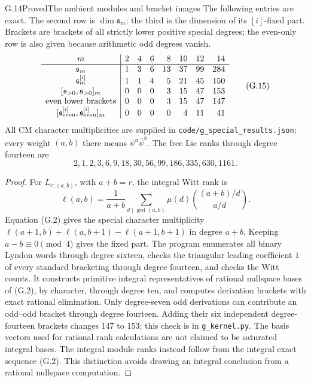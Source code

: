 \begin{statement}{G.14}{Proved}{The ambient modules and bracket images}
The following entries are exact. The second row is
$\dim\mathfrak s_m$; the third is the dimension of its $[i]$-fixed
part. Brackets are brackets of all strictly lower positive special
degrees; the even-only row is also given because arithmetic odd
degrees vanish.
\[
\begin{array}{c|rrrrrrr}
m&2&4&6&8&10&12&14\\\hline
\mathfrak s_m&1&3&6&13&37&99&284\\
\mathfrak s_m^{[i]}&1&1&4&5&21&45&150\\
{}[\mathfrak s_{>0},\mathfrak s_{>0}]_m&0&0&0&3&15&47&153\\
\text{even lower brackets}&0&0&0&3&15&47&147\\
{}[\mathfrak s_{\rm even}^{[i]},\mathfrak s_{\rm even}^{[i]}]_m
 &0&0&0&0&4&11&41
\end{array}                                             \tag{G.15}
\]
All CM character multiplicities are supplied in
\texttt{code/g\_special\_results.json}; every weight $(a,b)$ there
means $\psi^a\overline\psi^b$. The free Lie ranks through degree
fourteen are
\[
2,1,2,3,6,9,18,30,56,99,186,335,630,1161.
\tag{G.16}
\]
\end{statement}
\begin{proof}
For $L_{r;(a,b)}$, with $a+b=r$, the integral Witt rank is
\[
 \ell(a,b)=\frac1{a+b}\sum_{d\mid\gcd(a,b)}
      \mu(d)\binom{(a+b)/d}{a/d}.
\]
Equation (G.2) gives the special character multiplicity
$\ell(a+1,b)+\ell(a,b+1)-\ell(a+1,b+1)$ in degree $a+b$.
Keeping $a-b\equiv0\pmod4$ gives the fixed part. The program
enumerates all binary Lyndon words through degree sixteen,
checks the triangular leading coefficient $1$ of every standard
bracketing through degree fourteen, and checks the Witt counts.
It constructs primitive integral representatives of rational
nullspace bases of (G.2), by character, through degree ten, and
computes derivation brackets with exact rational elimination.
Only degree-seven odd derivations can contribute an odd--odd
bracket through degree fourteen. Adding their six independent
degree-fourteen brackets changes $147$ to $153$; this check is in
\texttt{g\_kernel.py}. The basis vectors used for rational rank
calculations are not claimed to be saturated integral bases.
The integral module ranks instead follow from the integral exact
sequence (G.2). This distinction avoids drawing an integral
conclusion from a rational nullspace computation.
\end{proof}

